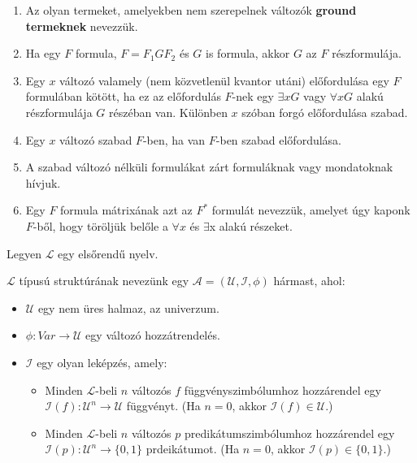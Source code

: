 \documentclass{beamer}
\newcommand{\mmedskip}{\vspace{0.5em}}
\begin{document}
\begin{frame}

\begin{tcolorbox}[title={Kötött, szabad változó, nyílt, zárt formula}]
\begin{enumerate}
\item Az olyan termeket, amelyekben nem szerepelnek változók \textbf{ground termeknek} nevezzük.
\item Ha egy $F$ formula, $F = F_1GF_2$ és $G$ is formula, akkor $G$ az $F$ részformulája.
\item Egy $x$ változó valamely (nem közvetlenül kvantor utáni) előfordulása egy $F$ formulában kötött, ha ez az előfordulás $F$-nek egy ${\exists}xG$ vagy ${\forall}xG$ alakú részformulája $G$ részéban van. Különben $x$ szóban forgó előfordulása szabad.
\item Egy $x$ változó szabad $F$-ben, ha van $F$-ben szabad előfordulása.
\item A szabad változó nélküli formulákat zárt formuláknak vagy mondatoknak hívjuk.
\item Egy $F$ formula mátrixának azt az $F^*$ formulát nevezzük, amelyet úgy kaponk $F$-ből, hogy töröljük belőle a ${\forall}x$ és ${\exists}$x alakú részeket.
\end{enumerate}
\end{tcolorbox}

\begin{tcolorbox}[title={Az elsőrendű nyelv szemantikája}]
Legyen $\mathcal{L}$ egy elsőrendű nyelv.\\
\mmedskip

$\mathcal{L}$ típusú struktúrának nevezünk egy $\mathcal{A} = (\mathcal{U}, \mathcal{I}, {\phi})$ hármast, ahol:\\
\mmedskip

\begin{itemize}
\item $\mathcal{U}$ egy nem üres halmaz, az univerzum.
\item ${\phi} : Var \rightarrow \mathcal{U}$ egy változó hozzátrendelés.
\item $\mathcal{I}$ egy olyan leképzés, amely:
\begin{itemize}
\item Minden $\mathcal{L}$-beli $n$ változós $f$ függvényszimbólumhoz hozzárendel egy $\mathcal{I}(f) : \mathcal{U}^n \rightarrow \mathcal{U}$ függvényt. (Ha $n = 0$, akkor $\mathcal{I}(f) \in \mathcal{U}$.)
\item Minden $\mathcal{L}$-beli $n$ változós $p$ predikátumszimbólumhoz hozzárendel egy $\mathcal{I}(p) : \mathcal{U}^n \rightarrow \{0, 1\}$ prdeikátumot. (Ha $n = 0$, akkor $\mathcal{I}(p) \in \{0, 1\}$.)
\end{itemize}
\end{itemize}

\end{tcolorbox}

\end{frame}
\end{document}
